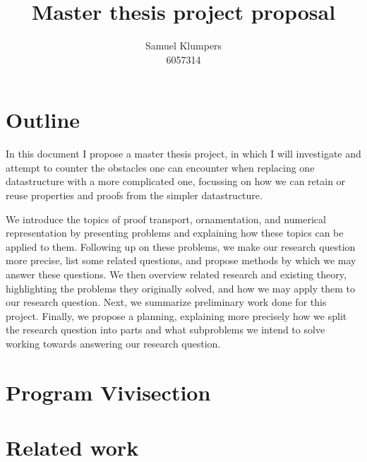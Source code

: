 \documentclass{article}
\title{Master thesis project proposal}
\author{Samuel Klumpers\\6057314}
\theoremstyle{plain}%
\theoremstyle{definition}
\begin{document}
\maketitle


\begin{comment}
\begin{abstract} %
    This thesis introduces the concepts of the structure identity principle, numerical representations, and ornamentations, and aims to combine these to simplify the presentation and verification of finger trees, demonstrating the generalizability and improved compactness and security of the resulting code. 
\end{abstract}
\end{comment}

\section*{Outline}
In this document I propose a master thesis project, in which I will investigate and attempt to counter the obstacles one can encounter when replacing one datastructure with a more complicated one, focussing on how we can retain or reuse properties and proofs from the simpler datastructure.

We introduce the topics of proof transport, ornamentation, and numerical representation by presenting problems and explaining how these topics can be applied to them. Following up on these problems, we make our research question more precise, list some related questions, and propose methods by which we may answer these questions. We then overview related research and existing theory, highlighting the problems they originally solved, and how we may apply them to our research question. Next, we summarize preliminary work done for this project. Finally, we propose a planning, explaining more precisely how we split the research question into parts and what subproblems we intend to solve working towards answering our research question.


\section{Program Vivisection}\label{sec:intro}



\section{Related work}\label{sec:resources}
\end{document}
